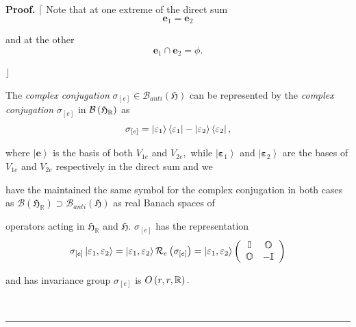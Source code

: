\documentclass[aps,preprint]{revtex4}
\newenvironment{proof}[1][Proof]{\noindent\textbf{#1.} }{\ \rule{0.5em}{0.5em}}
\begin{document}
\begin{proof}
$\lceil$ Note that at one extreme of the direct sum 
\begin{equation}
\mathbf{e}_{1}=\mathbf{e}_{2}
\end{equation}

and at the other 
\begin{equation}
\mathbf{e}_{1}\cap\mathbf{e}_{2}=\phi.
\end{equation}

$\rfloor$

The \emph{complex conjugation} $\sigma_{\left[ e\right] }\in\mathcal{B}%
_{anti}\left( \mathfrak{H}\right) $ can be represented by the \emph{complex
conjugation} $\sigma_{\left[ e\right] }$ in $\mathcal{B}\left( \mathfrak{H}_{%
\mathbb{R}}\right) $ as 
\begin{equation}
\sigma_{\left[ e\right] }=\left\vert \mathbf{\varepsilon}_{1}\right\rangle
\left\langle \mathbf{\varepsilon}_{1}\right\vert -\left\vert \mathbf{%
\varepsilon}_{2}\right\rangle \left\langle \mathbf{\varepsilon}%
_{2}\right\vert ,
\end{equation}

where $\left\vert \mathbf{e}\right\rangle $ is the basis of both $V_{1e}$
and $V_{2e},$ while $\left\vert \mathbf{\varepsilon }_{1}\right\rangle $ and 
$\left\vert \mathbf{\varepsilon }_{2}\right\rangle $ are the bases of $%
V_{1e} $ and $V_{2e}$ respectively in the direct sum and we

have the maintained the same symbol for the complex conjugation in both
cases as $\mathcal{B}\left( \mathfrak{H}_{\mathbb{R}}\right) \supset 
\mathcal{B}_{anti}\left( \mathfrak{H}\right) $ as real Banach spaces of

operators acting in $\mathfrak{H}_{\mathbb{R}}$ and $\mathfrak{H}$. $\sigma
_{\left[ e\right] }$ has the representation%
\begin{equation}
\sigma _{\left[ e\right] }\left\vert \mathbf{\varepsilon }_{1},\mathbf{%
\varepsilon }_{2}\right\rangle =\left\vert \mathbf{\varepsilon }_{1},\mathbf{%
\varepsilon }_{2}\right\rangle \mathcal{R}_{e}\left( \sigma _{\left[ e\right]
}\right) =\left\vert \mathbf{\varepsilon }_{1},\mathbf{\varepsilon }%
_{2}\right\rangle \left( 
\begin{array}{cc}
\mathbb{I} & \mathbb{O} \\ 
\mathbb{O} & -\mathbb{I}%
\end{array}%
\right)
\end{equation}

and has invariance group $\sigma_{\left[ e\right] }$ is $O\left( r,r,\mathbb{%
R}\right) .$


\end{proof}
\end{document}
